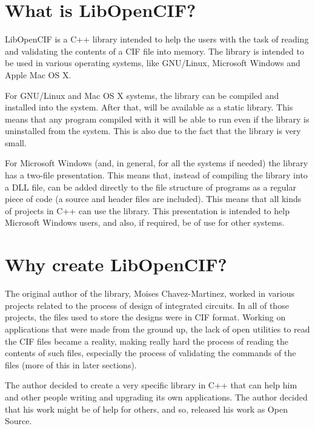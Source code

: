 \documentclass[11pt,twoside,openany,x11names,svgnames]{memoir}
\begin{document}
\section{What is LibOpenCIF?}\label{What-is-LibOpenCIF}

LibOpenCIF is a C++ library intended to help the users with the task of reading and validating the contents of a CIF file into memory. The library is intended to be used in various operating systems, like GNU/Linux, Microsoft Windows and Apple Mac OS X.

For GNU/Linux and Mac OS X systems, the library can be compiled and installed into the system. After that, will be available as a static library. This means that any program compiled with it will be able to run even if the library is uninstalled from the system. This is also due to the fact that the library is very small.

For Microsoft Windows (and, in general, for all the systems if needed) the library has a two-file presentation. This means that, instead of compiling the library into a DLL file, can be added directly to the file structure of programs as a regular piece of code (a source and header files are included). This means that all kinds of projects in C++ can use the library. This presentation is intended to help Microsoft Windows users, and also, if required, be of use for other systems.

\section{Why create LibOpenCIF?}\label{Why-create-LibOpenCIF}

The original author of the library, Moises Chavez-Martinez, worked in various projects related to the process of design of integrated circuits. In all of those projects, the files used to store the designs were in CIF format. Working on applications that were made from the ground up, the lack of open utilities to read the CIF files became a reality, making really hard the process of reading the contents of such files, especially the process of validating the commands of the files (more of this in later sections).

The author decided to create a very specific library in C++ that can help him and other people writing and upgrading its own applications. The author decided that his work might be of help for others, and so, released his work as Open Source.
\end{document}
